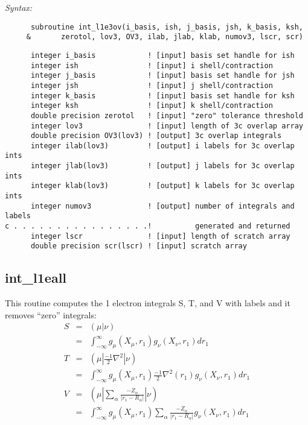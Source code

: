 {\it Syntax:} 
\begin{verbatim} 
      subroutine int_l1e3ov(i_basis, ish, j_basis, jsh, k_basis, ksh, 
     &       zerotol, lov3, OV3, ilab, jlab, klab, numov3, lscr, scr) 
\end{verbatim} 
\begin{verbatim} 
      integer i_basis            ! [input] basis set handle for ish 
      integer ish                ! [input] i shell/contraction 
      integer j_basis            ! [input] basis set handle for jsh 
      integer jsh                ! [input] j shell/contraction 
      integer k_basis            ! [input] basis set handle for ksh 
      integer ksh                ! [input] k shell/contraction 
      double precision zerotol   ! [input] "zero" tolerance threshold 
      integer lov3               ! [input] length of 3c overlap array 
      double precision OV3(lov3) ! [output] 3c overlap integrals 
      integer ilab(lov3)         ! [output] i labels for 3c overlap ints 
      integer jlab(lov3)         ! [output] j labels for 3c overlap ints 
      integer klab(lov3)         ! [output] k labels for 3c overlap ints 
      integer numov3             ! [output] number of integrals and labels  
c . . . . . . . . . . . . . . . .!          generated and returned 
      integer lscr               ! [input] length of scratch array 
      double precision scr(lscr) ! [input] scratch array 
\end{verbatim} 
\subsection{int\_l1eall} 
This routine computes the 1 electron integrals S, T, and V  
with labels and it removes ``zero'' integrals: 
\begin{eqnarray*}  
S & = & ({\mu}|{\nu}) \\ 
  & = & \int_{{-}\infty}^{\infty} g_{\mu}(X_{\mu},r_{1})g_{\nu}(X_{\nu},r_{1})dr_{1} \\ 
T & = & ({\mu}|\frac{-1}{2}{\nabla^{2}}|{\nu}) \\ 
  & = & \int_{-\infty}^{\infty} g_{\mu}(X_{\mu},r_{1})\frac{-1}{2}{\nabla^{2}}(r_{1})g_{\nu}(X_{\nu},r_{1})dr_{1} \\ 
V & = & ({\mu}|\sum_{\alpha}\frac{-Z_{\alpha}}{|r_{1}-R_{\alpha}|}|{\nu}) \\ 
  & = & \int_{-\infty}^{\infty}g_{\mu}(X_{\mu},r_{1})\sum_{\alpha}\frac{-Z_{\alpha}} 
{|r_{1}-R_{\alpha}|}g_{\nu}(X_{\nu},r_{1})dr_{1} 
\end{eqnarray*}  
 

